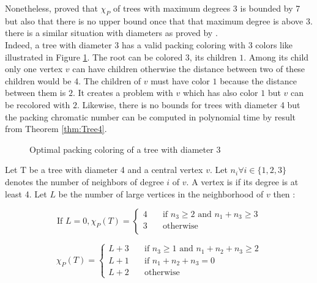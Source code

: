Nonetheless, \cite{Sloper} proved that $\chi_P$ of trees with maximum degrees 3 is bounded by 7 but also that there is no upper bound once that that maximum degree is above 3. there is a similar situation with diameters as proved by \cite{broadcastchromatic}. \\

Indeed, a tree with diameter 3 has a valid packing coloring with 3 colors like illustrated in Figure \ref{fig:treeD3}. The root can be colored $3$, its children $1$. Among its child only one vertex $v$ can have children otherwise the distance between two of these children would be 4. The children of $v$ must have color $1$ because the distance between them is $2$. It creates a problem with $v$ which has also color $1$ but $v$ can be recolored with $2$. Likewise, there is no bounds for trees with diameter 4 but the packing chromatic number can be computed in polynomial time by result from Theorem \ref{thm:Tree4}. \\



\begin{figure}
\centering
{}
\caption{Optimal packing coloring of a tree with diameter 3}
\label{fig:treeD3}
\end{figure}


\begin{thm}
\label{thm:Tree4}
Let T be a tree with diameter 4 and a central vertex $v$. Let $n_i \forall i \in \{1,2,3\}$ denotes the number of neighbors of degree $i$ of $v$. A vertex is  if its degree is at least 4. Let $L$ be the number of large vertices in the neighborhood of $v$ then :

\[ \text{If } L=0, \chi_P(T) =
  \begin{cases}
    4  & \quad \text{if $n_3 \geq 2$ and $n_1 + n_3 \geq 3$}  \\
    3  & \quad \text{otherwise }\\
  \end{cases}
\]


\[ \chi_P(T) =
  \begin{cases}
    L + 3      & \quad \text{if $n_3 \geq 1$ and $n_1 + n_2 + n_3 \geq 2$}  \\
    L + 1  & \quad \text{if $n_1 + n_2 + n_3 = 0$ }\\
    L+2 & \quad \text{otherwise}
  \end{cases}
\]
\end{thm}


